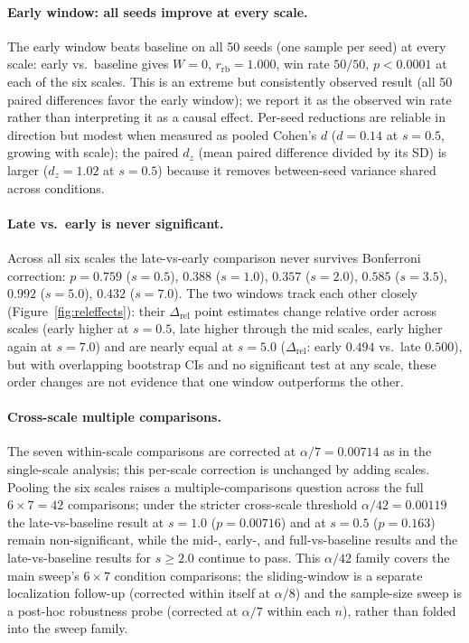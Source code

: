 \documentclass[10pt]{article}
\begin{document}
\paragraph{Early window: all seeds improve at every scale.}
The early window beats baseline on all 50 seeds (one sample per seed) at every
scale: early vs.\
baseline gives $W=0$, $r_\mathrm{rb}=1.000$, win rate $50/50$, $p<0.0001$ at
each of the six scales.  This is an extreme but consistently observed result
(all 50 paired differences favor the early window); we report it as the
observed win rate rather than interpreting it as a causal effect.  Per-seed reductions are reliable in direction but modest when measured as
pooled Cohen's $d$ ($d=0.14$ at $s=0.5$, growing with scale); the paired
$d_z$ (mean paired difference divided by its SD) is larger ($d_z=1.02$ at
$s=0.5$) because it removes between-seed variance shared across conditions.

\paragraph{Late vs.\ early is never significant.}
Across all six scales the late-vs-early comparison never survives Bonferroni
correction: $p=0.759$ ($s=0.5$), $0.388$ ($s=1.0$), $0.357$ ($s=2.0$), $0.585$
($s=3.5$), $0.992$ ($s=5.0$), $0.432$ ($s=7.0$).  The two windows track each
other closely (Figure~\ref{fig:releffects}): their $\Delta_\mathrm{rel}$ point
estimates change relative order across scales (early higher at $s=0.5$, late
higher through the mid scales, early higher again at $s=7.0$) and are nearly
equal at $s=5.0$ ($\Delta_\mathrm{rel}$: early $0.494$ vs.\ late $0.500$), but
with overlapping bootstrap CIs and no significant test at any scale, these
order changes are not evidence that one window outperforms the other.

\paragraph{Cross-scale multiple comparisons.}
The seven within-scale comparisons are corrected at $\alpha/7=0.00714$ as in
the single-scale analysis; this per-scale correction is unchanged by adding
scales.  Pooling the six scales raises a multiple-comparisons question across
the full $6\times7=42$ comparisons; under the stricter cross-scale threshold
$\alpha/42=0.00119$ the late-vs-baseline result at $s=1.0$ ($p=0.00716$) and at
$s=0.5$ ($p=0.163$) remain non-significant, while the mid-, early-, and
full-vs-baseline results and the late-vs-baseline results for $s\ge 2.0$
continue to pass.  This $\alpha/42$ family covers the main sweep's
$6\times7$ condition comparisons; the sliding-window is a separate localization
follow-up (corrected within itself at $\alpha/8$) and the sample-size sweep is a
post-hoc robustness probe (corrected at $\alpha/7$ within each $n$), rather than
folded into the sweep family.
\end{document}
